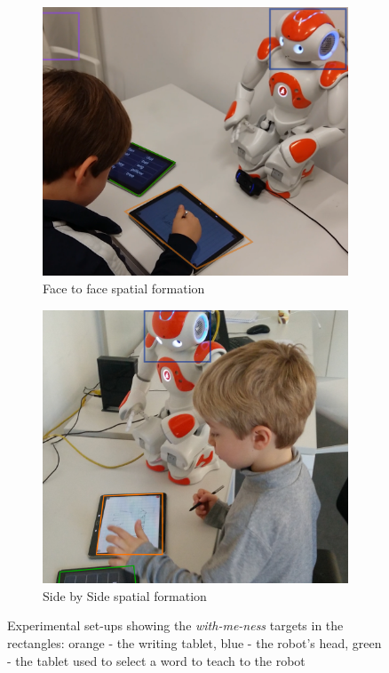 \documentclass[letterpaper, 10 pt, conference]{ieeeconf}  %
\begin{document}
\begin{figure}
\centering
\begin{subfigure}{0.5\textwidth}
  \centering
  \includegraphics[width=0.8\linewidth]{./figures/f2f_photot.png}
  \caption{Face to face spatial formation}
  \label{fig:sub1}
\end{subfigure}%
\begin{subfigure}{0.5\textwidth}
  \centering
  \includegraphics[width=0.8\linewidth]{./figures/s2s_photo2t.jpg}
  \caption{Side by Side spatial formation}
  \label{fig:sub2}
\end{subfigure}
 \caption{Experimental set-ups showing the \emph{with-me-ness} targets in the rectangles: orange - the writing tablet,  blue - the robot's head, green - the tablet used to select a word to teach to the robot}
\label{fig:test}
\end{figure}
\end{document}

